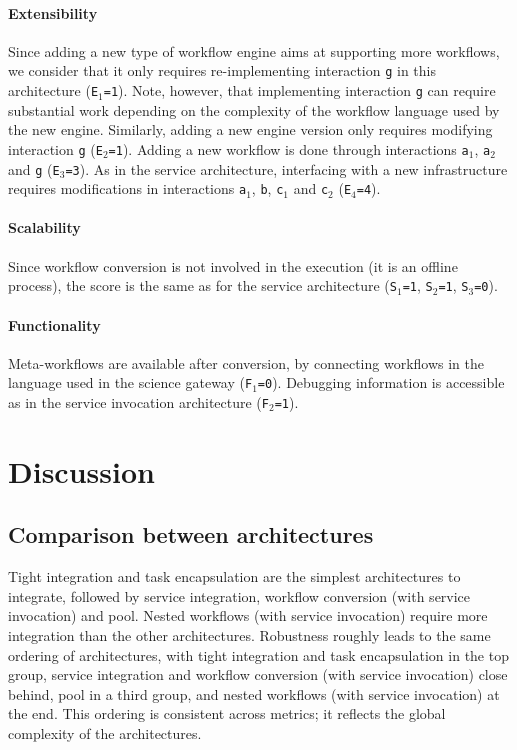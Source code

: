 \documentclass[preprint,3p,twocolumn]{elsarticle}
\newcommand{\correction}[1]{\color{blue}#1\color{black}\xspace}
\begin{document}
\paragraph{Extensibility} Since adding a new type of workflow engine
aims at supporting more workflows, we consider that it only requires
re-implementing interaction \texttt{g} in this architecture  (\texttt{E$_1$=1}). Note,
however, that implementing interaction \texttt{g} can require
substantial work depending on the complexity of the workflow language used by
the new engine. Similarly, adding a
new engine version only requires modifying interaction \texttt{g}
(\texttt{E$_2$=1}).  Adding a new workflow is done through
interactions \texttt{a$_1$}, \texttt{a$_2$} and \texttt{g} (\texttt{E$_3$=3}). As in the
service architecture, interfacing with a new infrastructure requires
modifications in interactions \texttt{a$_1$}, \texttt{b}, \texttt{c$_1$}
and \texttt{c$_2$} (\texttt{E$_4$=4}).

\paragraph{Scalability}  Since workflow conversion is not involved in
the execution (it is an offline process), the score is the same as for the
service architecture (\texttt{S$_1$=1},
\texttt{S$_2$=1}, \texttt{S$_3$=0}).

\paragraph{\correction{Functionality}} Meta-workflows are available after
conversion, by connecting workflows in the language used in the
science gateway (\texttt{\correction{F}$_1$=0}).  Debugging information is accessible
as in the service invocation architecture (\texttt{\correction{F}$_2$=1}).

\section{Discussion}
\label{sec:discussion}
\subsection{Comparison between architectures}

Tight integration and task encapsulation are the simplest
architectures to integrate, followed by service integration, workflow conversion (with
service invocation) and pool. Nested workflows (with service
invocation) require more integration than the other
architectures. Robustness roughly leads to the same ordering of
architectures, with tight integration and task encapsulation in the top
group, service integration and workflow conversion (with service
invocation) close behind, pool in a third group, and nested workflows
(with service invocation) at the end. This ordering is consistent
across metrics; it reflects the global complexity of the
architectures.
\end{document}
